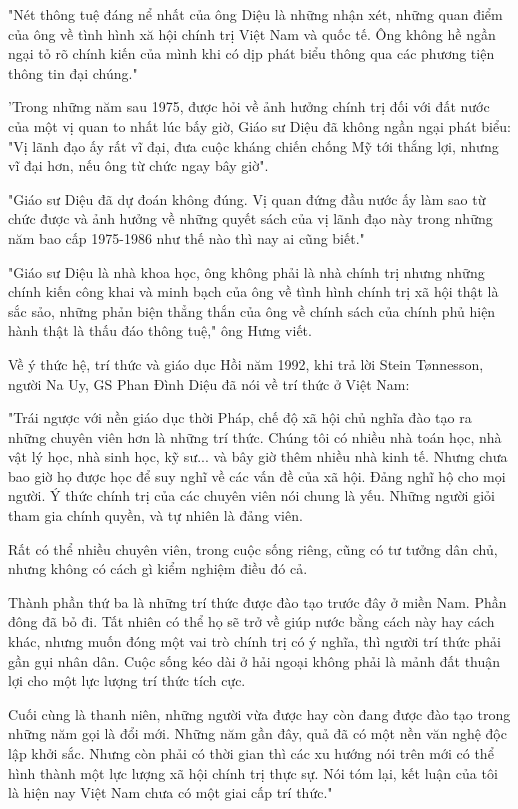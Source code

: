 "Nét thông tuệ đáng nể nhất của ông Diệu là những nhận xét, những quan điểm của ông về tình hình xă hội chính trị Việt Nam và quốc tế. Ông không hề ngần ngại tỏ rõ chính kiến của mình khi có dịp phát biểu thông qua các phương tiện thông tin đại chúng."

'Trong những năm sau 1975, được hỏi về ảnh hưởng chính trị đối với đất nước của một vị quan to nhất lúc bấy giờ, Giáo sư Diệu đã không ngần ngại phát biểu: "Vị lãnh đạo ấy rất vĩ đại, đưa cuộc kháng chiến chống Mỹ tới thắng lợi, nhưng vĩ đại hơn, nếu ông từ chức ngay bây giờ".

"Giáo sư Diệu đã dự đoán không đúng. Vị quan đứng đầu nước ấy làm sao từ chức được và ảnh hưởng về những quyết sách của vị lãnh đạo này trong những năm bao cấp 1975-1986 như thế nào thì nay ai cũng biết."

"Giáo sư Diệu là nhà khoa học, ông không phải là nhà chính trị nhưng những chính kiến công khai và minh bạch của ông về tình hình chính trị xã hội thật là sắc sảo, những phản biện thẳng thắn của ông về chính sách của chính phủ hiện hành thật là thấu đáo thông tuệ," ông Hưng viết.

Về ý thức hệ, trí thức và giáo dục
Hồi năm 1992, khi trả lời Stein Tønnesson, người Na Uy, GS Phan Đình Diệu đã nói về trí thức ở Việt Nam:

"Trái ngược với nền giáo dục thời Pháp, chế độ xã hội chủ nghĩa đào tạo ra những chuyên viên hơn là những trí thức. Chúng tôi có nhiều nhà toán học, nhà vật lý học, nhà sinh học, kỹ sư... và bây giờ thêm nhiều nhà kinh tế. Nhưng chưa bao giờ họ được học để suy nghĩ về các vấn đề của xã hội. Đảng nghĩ hộ cho mọi người. Ý thức chính trị của các chuyên viên nói chung là yếu. Những người giỏi tham gia chính quyền, và tự nhiên là đảng viên.

Rất có thể nhiều chuyên viên, trong cuộc sống riêng, cũng có tư tưởng dân chủ, nhưng không có cách gì kiểm nghiệm điều đó cả.

Thành phần thứ ba là những trí thức được đào tạo trước đây ở miền Nam. Phần đông đã bỏ đi. Tất nhiên có thể họ sẽ trở về giúp nước bằng cách này hay cách khác, nhưng muốn đóng một vai trò chính trị có ý nghĩa, thì người trí thức phải gần gụi nhân dân. Cuộc sống kéo dài ở hải ngoại không phải là mảnh đất thuận lợi cho một lực lượng trí thức tích cực.

Cuối cùng là thanh niên, những người vừa được hay còn đang được đào tạo trong những năm gọi là đổi mới. Những năm gần đây, quả đã có một nền văn nghệ độc lập khởi sắc. Nhưng còn phải có thời gian thì các xu hướng nói trên mới có thể hình thành một lực lượng xã hội chính trị thực sự. Nói tóm lại, kết luận của tôi là hiện nay Việt Nam chưa có một giai cấp trí thức."

